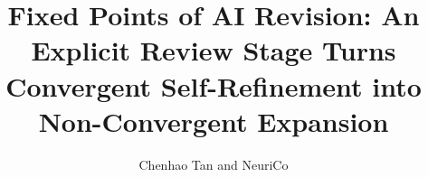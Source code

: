 \documentclass{article}
\title{Fixed Points of AI Revision: An Explicit Review Stage Turns Convergent Self-Refinement into Non-Convergent Expansion}
\author{Chenhao Tan and NeuriCo}
\begin{document}
\maketitle

\begin{abstract}

\end{abstract}









\end{document}
